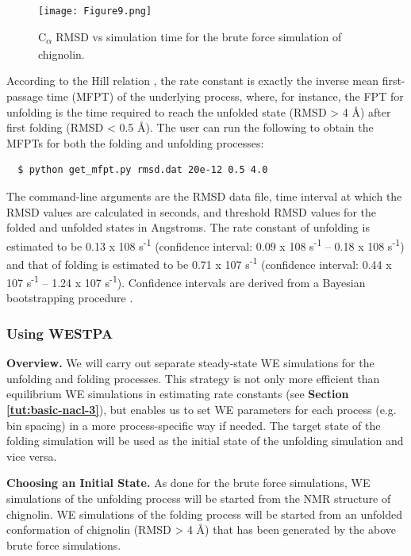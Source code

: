 \begin{figure}
\texttt{[image: Figure9.png]}
\caption{C\textsubscript{$\alpha$} RMSD vs simulation time for the brute force simulation of chignolin.}
\label{fig:chig-rmsd}
\vspace{-0.25cm}
\end{figure}

According to the Hill relation \citep{Hill1989}, the rate constant is exactly the inverse mean first-passage time (MFPT) of the underlying process, where, for instance, the FPT for unfolding is the time required to reach the unfolded state (RMSD > 4 \AA) after first folding (RMSD < 0.5 \AA). 
The user can run the following to obtain the MFPTs for both the folding and unfolding processes: 
\begin{verbatim}
  $ python get_mfpt.py rmsd.dat 20e-12 0.5 4.0
\end{verbatim}

The command-line arguments are the RMSD data file, time interval at which the RMSD values are calculated in seconds, and threshold RMSD values for the folded and unfolded states in Angstroms. 
The rate constant of unfolding is estimated to be 0.13 x 108 s\textsuperscript{-1} (confidence interval: 0.09 x 108 s\textsuperscript{-1} – 0.18 x 108 s\textsuperscript{-1}) and that of folding is estimated to be 0.71 x 107 s\textsuperscript{-1} (confidence interval: 0.44 x 107 s\textsuperscript{-1} – 1.24 x 107 s\textsuperscript{-1}). 
Confidence intervals are derived from a Bayesian bootstrapping procedure \citep{mostofian_statistical_2019}. 

\subsubsection{Using WESTPA}

\textbf{Overview.} We will carry out separate steady-state WE simulations for the unfolding and folding processes. 
This strategy is not only more efficient than equilibrium WE simulations in estimating rate constants (see \textbf{Section \ref{tut:basic-nacl-3}}), but enables us to set WE parameters for each process (e.g. bin spacing) in a more process-specific way if needed. 
The target state of the folding simulation will be used as the initial state of the unfolding simulation and vice versa. 

\textbf{Choosing an Initial State.} As done for the brute force simulations, WE simulations of the unfolding process will be started from the NMR structure of chignolin. 
WE simulations of the folding process will be started from an unfolded conformation of chignolin (RMSD > 4 \AA) that has been generated by the above brute force simulations.
 

